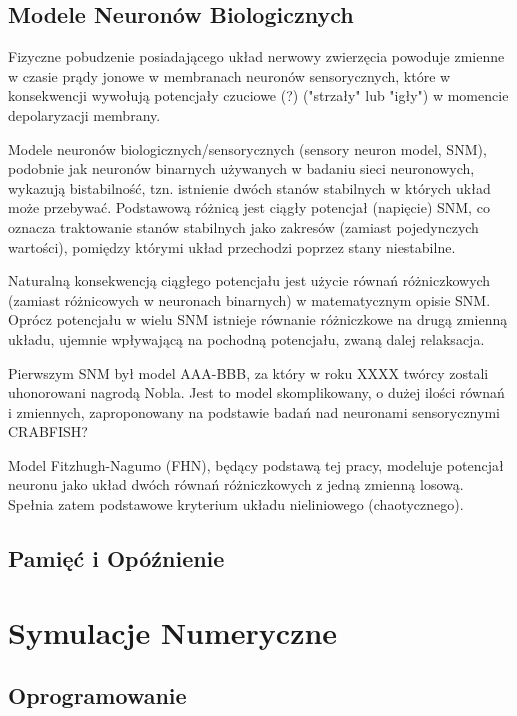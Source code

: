 \documentclass[12pt]{article}
\begin{document}
  \subsection{Modele Neuronów Biologicznych}
  
  Fizyczne pobudzenie posiadającego układ nerwowy zwierzęcia powoduje zmienne w czasie prądy jonowe w membranach neuronów sensorycznych, które w konsekwencji wywołują potencjały czuciowe (?) ("strzały" lub "igły") w momencie depolaryzacji membrany.
  
  Modele neuronów biologicznych/sensorycznych (sensory neuron model, SNM), podobnie jak neuronów binarnych używanych w badaniu sieci neuronowych, wykazują bistabilność, tzn. istnienie dwóch stanów stabilnych w których układ może przebywać. Podstawową różnicą jest ciągły potencjał (napięcie) SNM, co oznacza traktowanie stanów stabilnych jako zakresów (zamiast pojedynczych wartości), pomiędzy którymi układ przechodzi poprzez stany niestabilne. 
  
  Naturalną konsekwencją ciągłego potencjału jest użycie równań różniczkowych (zamiast różnicowych w neuronach binarnych) w matematycznym opisie SNM. Oprócz potencjału w wielu SNM istnieje równanie różniczkowe na drugą zmienną układu, ujemnie wpływającą na pochodną potencjału, zwaną dalej relaksacja.
  
  Pierwszym SNM był model AAA-BBB, za który w roku XXXX twórcy zostali uhonorowani nagrodą Nobla. Jest to model skomplikowany, o dużej ilości równań i zmiennych, zaproponowany na podstawie badań nad neuronami sensorycznymi CRABFISH?
  
  Model Fitzhugh-Nagumo (FHN), będący podstawą tej pracy, modeluje potencjał neuronu jako układ dwóch równań różniczkowych z jedną zmienną losową. Spełnia zatem podstawowe kryterium układu nieliniowego (chaotycznego).
  
  \subsection{Pamięć i Opóźnienie}
  
  
  \section{Symulacje Numeryczne}
  
  \subsection{Oprogramowanie}
  
\end{document}
